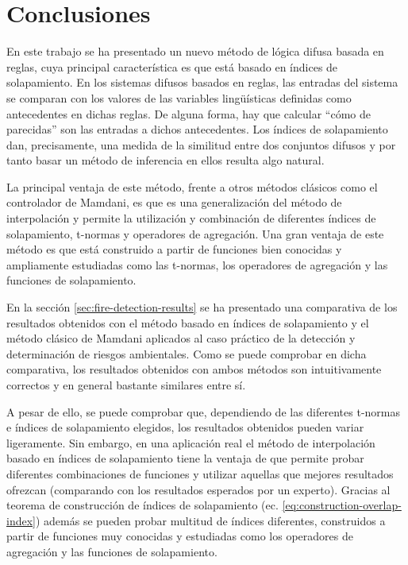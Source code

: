 \chapter{Conclusiones}
En este trabajo se ha presentado un nuevo método de lógica difusa basada en reglas, cuya principal característica es que está basado en índices de solapamiento. En los sistemas difusos basados en reglas, las entradas del sistema se comparan con los valores de las variables lingüísticas definidas como antecedentes en dichas reglas. De alguna forma, hay que calcular ``cómo de parecidas'' son las entradas a dichos antecedentes. Los índices de solapamiento dan, precisamente, una medida de la similitud entre dos conjuntos difusos y por tanto basar un método de inferencia en ellos resulta algo natural.

La principal ventaja de este método, frente a otros métodos clásicos como el controlador de Mamdani, es que es una generalización del método de interpolación y permite la utilización y combinación de diferentes índices de solapamiento, t-normas y operadores de agregación. Una gran ventaja de este método es que está construido a partir de funciones bien conocidas y ampliamente estudiadas como las t-normas, los operadores de agregación y las funciones de solapamiento.

En la sección \ref{sec:fire-detection-results} se ha presentado una comparativa de los resultados obtenidos con el método basado en índices de solapamiento y el método clásico de Mamdani aplicados al caso práctico de la detección y determinación de riesgos ambientales. Como se puede comprobar en dicha comparativa, los resultados obtenidos con ambos métodos son intuitivamente correctos y en general bastante similares entre sí. 

A pesar de ello, se puede comprobar que, dependiendo de las diferentes t-normas e índices de solapamiento elegidos, los resultados obtenidos pueden variar ligeramente. Sin embargo, en una aplicación real el método de interpolación basado en índices de solapamiento tiene la ventaja de que permite probar diferentes combinaciones de funciones y utilizar aquellas que mejores resultados ofrezcan (comparando con los resultados esperados por un experto). Gracias al teorema de construcción de índices de solapamiento (ec. \ref{eq:construction-overlap-index}) además se pueden probar multitud de índices diferentes, construidos a partir de funciones muy conocidas y estudiadas como los operadores de agregación y las funciones de solapamiento.

